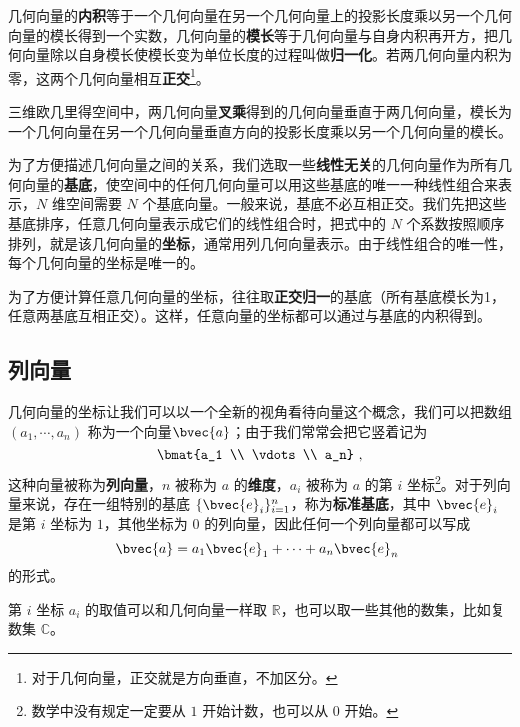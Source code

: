 几何向量的\textbf{内积}等于一个几何向量在另一个几何向量上的投影长度乘以另一个几何向量的模长得到一个实数，几何向量的\textbf{模长}等于几何向量与自身内积再开方，把几何向量除以自身模长使模长变为单位长度的过程叫做\textbf{归一化}。若两几何向量内积为零，这两个几何向量相互\textbf{正交}\footnote{对于几何向量，正交就是方向垂直，不加区分。}。

三维欧几里得空间中，两几何向量\textbf{叉乘}得到的几何向量垂直于两几何向量，模长为一个几何向量在另一个几何向量垂直方向的投影长度乘以另一个几何向量的模长。

为了方便描述几何向量之间的关系，我们选取一些\textbf{线性无关}的几何向量作为所有几何向量的\textbf{基底}，使空间中的任何几何向量可以用这些基底的唯一一种线性组合来表示，$N$ 维空间需要 $N$ 个基底向量。一般来说，基底不必互相正交。我们先把这些基底排序，任意几何向量表示成它们的线性组合时，把式中的 $N$ 个系数按照顺序排列，就是该几何向量的\textbf{坐标}，通常用列几何向量表示。由于线性组合的唯一性，每个几何向量的坐标是唯一的。

为了方便计算任意几何向量的坐标，往往取\textbf{正交归一}的基底（所有基底模长为1，任意两基底互相正交）。这样，任意向量的坐标都可以通过与基底的内积得到。


\subsection{列向量}

几何向量的坐标让我们可以以一个全新的视角看待向量这个概念，我们可以把数组 $(a_1, \cdots, a_n)$ 称为一个向量$\bvec{a}$；由于我们常常会把它竖着记为
\begin{equation}
\bmat{a_1 \\ \vdots \\ a_n}~,
\end{equation}
这种向量被称为\textbf{列向量}，$n$ 被称为 $a$ 的\textbf{维度}，$a_i$ 被称为 $a$ 的第 $i$ 坐标\footnote{数学中没有规定一定要从 $1$ 开始计数，也可以从 $0$ 开始。}。对于列向量来说，存在一组特别的基底 $\{\bvec{e}_i\}_{i = 1}^n$，称为\textbf{标准基底}，其中 $\bvec{e}_i$ 是第 $i$ 坐标为 $1$，其他坐标为 $0$ 的列向量，因此任何一个列向量都可以写成
\begin{equation}
\bvec{a} = a_1 \bvec{e}_1 + \cdots + a_n \bvec{e}_n~
\end{equation}
的形式。

第 $i$ 坐标 $a_i$ 的取值可以和几何向量一样取 $\mathbb{R}$，也可以取一些其他的数集，比如复数集 $\mathbb{C}$。

